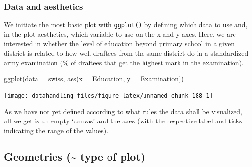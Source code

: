 \documentclass[
  12pt,
]{style/krantz}
\newenvironment{Shaded}{\begin{snugshade}}{\end{snugshade}}
\newcommand{\AttributeTok}[1]{\textcolor[rgb]{0.77,0.63,0.00}{#1}}
\newcommand{\CommentTok}[1]{\textcolor[rgb]{0.56,0.35,0.01}{\textit{#1}}}
\newcommand{\DecValTok}[1]{\textcolor[rgb]{0.00,0.00,0.81}{#1}}
\newcommand{\FunctionTok}[1]{\textcolor[rgb]{0.00,0.00,0.00}{#1}}
\newcommand{\NormalTok}[1]{#1}
\newcommand{\OtherTok}[1]{\textcolor[rgb]{0.56,0.35,0.01}{#1}}
\newcommand{\SpecialCharTok}[1]{\textcolor[rgb]{0.00,0.00,0.00}{#1}}
\newcommand{\StringTok}[1]{\textcolor[rgb]{0.31,0.60,0.02}{#1}}
\begin{document}
\begin{Shaded}
\end{Shaded}

\hypertarget{data-and-aesthetics}{%
\subsubsection{Data and aesthetics}\label{data-and-aesthetics}}

We initiate the most basic plot with \texttt{ggplot()} by defining which data to use and, in the plot aesthetics, which variable to use on the x and y axes. Here, we are interested in whether the level of education beyond primary school in a given district is related to how well draftees from the same district do in a standardized army examination (\% of draftees that get the highest mark in the examination).

\begin{Shaded}
\begin{Highlighting}[]
\FunctionTok{ggplot}\NormalTok{(}\AttributeTok{data =}\NormalTok{ swiss, }\FunctionTok{aes}\NormalTok{(}\AttributeTok{x =}\NormalTok{ Education, }\AttributeTok{y =}\NormalTok{ Examination))}
\end{Highlighting}
\end{Shaded}

\texttt{[image: datahandling\_files/figure-latex/unnamed-chunk-188-1]}

As we have not yet defined according to what rules the data shall be visualized, all we get is an empty `canvas' and the axes (with the respective label and ticks indicating the range of the values).

\hypertarget{geometries-type-of-plot}{%
\subsection{Geometries (\textasciitilde{} type of plot)}\label{geometries-type-of-plot}}
\end{document}
